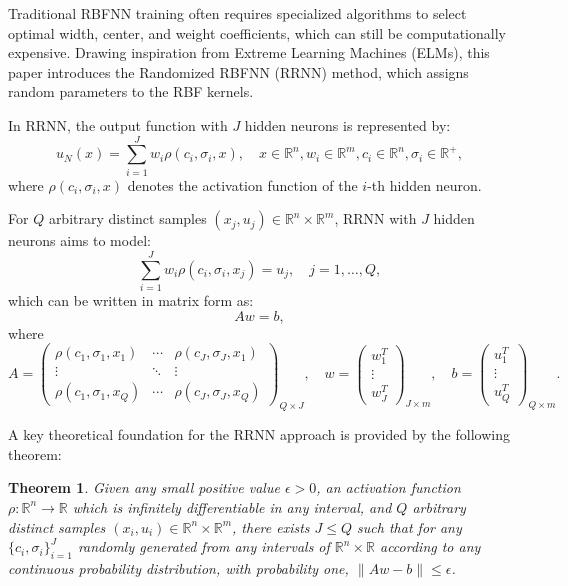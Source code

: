 \documentclass[11pt]{article}
\newtheorem{theorem}{Theorem}
\begin{document}
Traditional RBFNN training often requires specialized algorithms to select optimal width, center, and weight coefficients, which can still be computationally expensive. Drawing inspiration from Extreme Learning Machines (ELMs), this paper introduces the Randomized RBFNN (RRNN) method, which assigns random parameters to the RBF kernels.

In RRNN, the output function with $J$ hidden neurons is represented by:
\begin{equation}
u_N(x) = \sum_{i=1}^J w_i \rho(c_i, \sigma_i, x), \quad x \in \mathbb{R}^n, w_i \in \mathbb{R}^m, c_i \in \mathbb{R}^n, \sigma_i \in \mathbb{R}^+,
\end{equation}
where $\rho(c_i, \sigma_i, x)$ denotes the activation function of the $i$-th hidden neuron.

For $Q$ arbitrary distinct samples $(x_j, u_j) \in \mathbb{R}^n \times \mathbb{R}^m$, RRNN with $J$ hidden neurons aims to model:
\begin{equation}
\sum_{i=1}^J w_i \rho(c_i, \sigma_i, x_j) = u_j, \quad j = 1, \ldots, Q,
\end{equation}
which can be written in matrix form as:
\begin{equation}
A w = b,
\end{equation}
where
\begin{equation}
A = \begin{pmatrix}
\rho(c_1, \sigma_1, x_1) & \cdots & \rho(c_J, \sigma_J, x_1) \\
\vdots & \ddots & \vdots \\
\rho(c_1, \sigma_1, x_Q) & \cdots & \rho(c_J, \sigma_J, x_Q)
\end{pmatrix}_{Q \times J}, \quad
w = \begin{pmatrix}
w_1^T \\
\vdots \\
w_J^T
\end{pmatrix}_{J \times m}, \quad
b = \begin{pmatrix}
u_1^T \\
\vdots \\
u_Q^T
\end{pmatrix}_{Q \times m}.
\end{equation}

A key theoretical foundation for the RRNN approach is provided by the following theorem:

\begin{theorem}
Given any small positive value $\epsilon > 0$, an activation function $\rho: \mathbb{R}^n \rightarrow \mathbb{R}$ which is infinitely differentiable in any interval, and $Q$ arbitrary distinct samples $(x_i, u_i) \in \mathbb{R}^n \times \mathbb{R}^m$, there exists $J \leq Q$ such that for any $\{c_i, \sigma_i\}_{i=1}^J$ randomly generated from any intervals of $\mathbb{R}^n \times \mathbb{R}$ according to any continuous probability distribution, with probability one, $\|Aw - b\| \leq \epsilon$.
\end{theorem}
\end{document}
